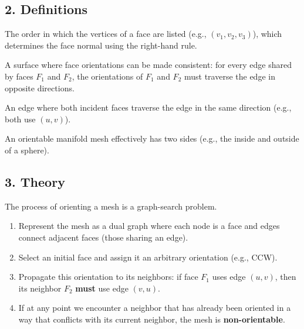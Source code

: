 \subsection{2. Definitions}

\begin{definition}\label{def:face_orientation}
The order in which the vertices of a face are listed (e.g., $(v_1, v_2, v_3)$), which determines the face normal using the right-hand rule.
\end{definition}

\begin{definition}\label{def:orientable_surface}
A surface where face orientations can be made consistent: for every edge shared by faces $F_1$ and $F_2$, the orientations of $F_1$ and $F_2$ must traverse the edge in opposite directions.
\end{definition}

\begin{definition}\label{def:inconsistent_edge}
An edge where both incident faces traverse the edge in the same direction (e.g., both use $(u, v)$).
\end{definition}

\begin{definition}\label{def:two_sided}
An orientable manifold mesh effectively has two sides (e.g., the inside and outside of a sphere).
\end{definition}

\subsection{3. Theory}

The process of orienting a mesh is a graph-search problem.
\begin{enumerate}
    \item Represent the mesh as a dual graph where each node is a face and edges connect adjacent faces (those sharing an edge).
    \item Select an initial face and assign it an arbitrary orientation (e.g., CCW).
    \item Propagate this orientation to its neighbors: if face $F_1$ uses edge $(u, v)$, then its neighbor $F_2$ \textbf{must} use edge $(v, u)$.
    \item If at any point we encounter a neighbor that has already been oriented in a way that conflicts with its current neighbor, the mesh is \textbf{non-orientable}.
\end{enumerate}

